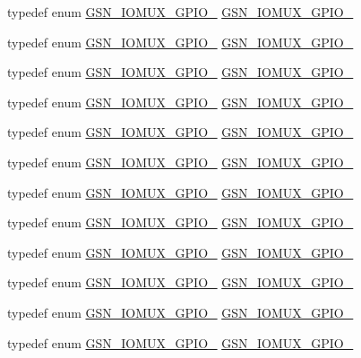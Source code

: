 \begin{DoxyCompactItemize}
\item 
typedef enum \hyperlink{a00519_a367109678df687289a7897b0cfd80b4a}{GSN\_\-IOMUX\_\-GPIO\_} \hyperlink{a00519_a47791ebdd0d63309e31435ca7455ecc5}{GSN\_\-IOMUX\_\-GPIO\_}
\item 
typedef enum \hyperlink{a00519_ae7e6faba6ec8760f7e46ff0fe8dc7412}{GSN\_\-IOMUX\_\-GPIO\_} \hyperlink{a00519_a63045bdbde3be775ae1343b16d2a665c}{GSN\_\-IOMUX\_\-GPIO\_}
\item 
typedef enum \hyperlink{a00519_a7fb4ec9b8fae8563ec4216544475854d}{GSN\_\-IOMUX\_\-GPIO\_} \hyperlink{a00519_abfb65a61e456663df140b3e9ac76eab4}{GSN\_\-IOMUX\_\-GPIO\_}
\item 
typedef enum \hyperlink{a00519_add13f1a7b2158125a72480380aae7651}{GSN\_\-IOMUX\_\-GPIO\_} \hyperlink{a00519_ac61fc9c6e7000a0c60b1be6b99ec9cb8}{GSN\_\-IOMUX\_\-GPIO\_}
\item 
typedef enum \hyperlink{a00519_a75355127354ab0ecdc012bd92dab342f}{GSN\_\-IOMUX\_\-GPIO\_} \hyperlink{a00519_a84f4d41b1d6182b335fb4c52637042b2}{GSN\_\-IOMUX\_\-GPIO\_}
\item 
typedef enum \hyperlink{a00519_a88ad3958e476541f6f56ac2adb3e6218}{GSN\_\-IOMUX\_\-GPIO\_} \hyperlink{a00519_af9da84605ff799ce835dd419828a8500}{GSN\_\-IOMUX\_\-GPIO\_}
\item 
typedef enum \hyperlink{a00519_a79ae1b7c666e4b5ebe6c49f29cd0d8d2}{GSN\_\-IOMUX\_\-GPIO\_} \hyperlink{a00519_a709de42a0dbc64e3b5c58cb04b538188}{GSN\_\-IOMUX\_\-GPIO\_}
\item 
typedef enum \hyperlink{a00519_afa6173189136b639c78c6019bc59d4ac}{GSN\_\-IOMUX\_\-GPIO\_} \hyperlink{a00519_a12cb936233abee7a102f1a6b8bcdc96a}{GSN\_\-IOMUX\_\-GPIO\_}
\item 
typedef enum \hyperlink{a00519_a5fa705c1a76dfb74659f90fcdc65b0e1}{GSN\_\-IOMUX\_\-GPIO\_} \hyperlink{a00519_ad1e24293eb243a2fdda6a690f84b3521}{GSN\_\-IOMUX\_\-GPIO\_}
\item 
typedef enum \hyperlink{a00519_a46836e1fee802d5f2be675a93327d2f0}{GSN\_\-IOMUX\_\-GPIO\_} \hyperlink{a00519_a0be4210376fefc24fa4664e4f560079d}{GSN\_\-IOMUX\_\-GPIO\_}
\item 
typedef enum \hyperlink{a00519_a298d52f4e286236c7429f0bd7044a6f0}{GSN\_\-IOMUX\_\-GPIO\_} \hyperlink{a00519_a016022cd41f1ec98936baaf319141d93}{GSN\_\-IOMUX\_\-GPIO\_}
\item 
typedef enum \hyperlink{a00519_ac20155aedc6f2679ad6131330ea483e8}{GSN\_\-IOMUX\_\-GPIO\_} \hyperlink{a00519_a995b4db3126405c70848ff3b538c108c}{GSN\_\-IOMUX\_\-GPIO\_}

\end{DoxyCompactItemize}
